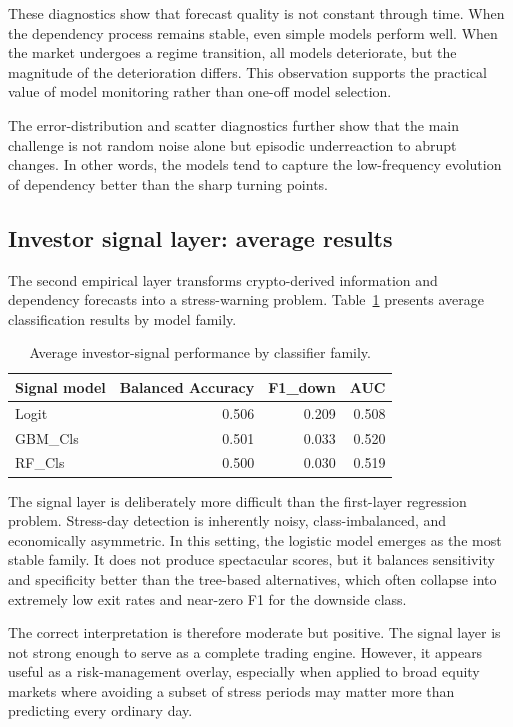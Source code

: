 These diagnostics show that forecast quality is not constant through time. When the dependency process remains stable, even simple models perform well. When the market undergoes a regime transition, all models deteriorate, but the magnitude of the deterioration differs. This observation supports the practical value of model monitoring rather than one-off model selection.

The error-distribution and scatter diagnostics further show that the main challenge is not random noise alone but episodic underreaction to abrupt changes. In other words, the models tend to capture the low-frequency evolution of dependency better than the sharp turning points.

\subsection{Investor signal layer: average results}

The second empirical layer transforms crypto-derived information and dependency forecasts into a stress-warning problem. Table~\ref{tab:signal_summary} presents average classification results by model family.

\begin{table}[H]
    \centering
    \caption{Average investor-signal performance by classifier family.}
    \label{tab:signal_summary}
    \begin{tabular}{lrrr}
        \toprule
        Signal model & Balanced Accuracy & F1\_down & AUC \\
        \midrule
        Logit & 0.506 & 0.209 & 0.508 \\
        GBM\_Cls & 0.501 & 0.033 & 0.520 \\
        RF\_Cls & 0.500 & 0.030 & 0.519 \\
        \bottomrule
    \end{tabular}
\end{table}

The signal layer is deliberately more difficult than the first-layer regression problem. Stress-day detection is inherently noisy, class-imbalanced, and economically asymmetric. In this setting, the logistic model emerges as the most stable family. It does not produce spectacular scores, but it balances sensitivity and specificity better than the tree-based alternatives, which often collapse into extremely low exit rates and near-zero F1 for the downside class.

The correct interpretation is therefore moderate but positive. The signal layer is not strong enough to serve as a complete trading engine. However, it appears useful as a risk-management overlay, especially when applied to broad equity markets where avoiding a subset of stress periods may matter more than predicting every ordinary day.

